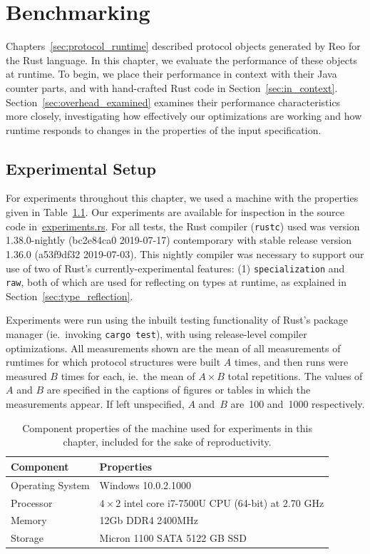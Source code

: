 \chapter{Benchmarking}
\label{sec:benchmarking}

Chapters~\ref{sec:protocol_runtime} described protocol objects generated by Reo for the Rust language. In this chapter, we evaluate the performance of these objects at runtime. To begin, we place their performance in context with their Java counter parts, and with hand-crafted Rust code in Section~\ref{sec:in_context}. Section~\ref{sec:overhead_examined} examines their performance characteristics more closely, investigating how effectively our optimizations are working and how runtime responds to changes in the properties of the input specification.

\section{Experimental Setup}
For experiments throughout this chapter, we used a machine with the properties given in Table~\ref{tab:nomad}. Our experiments are available for inspection in the source code in~\url{experiments.rs}. For all tests, the Rust compiler (\texttt{rustc}) used was version 1.38.0-nightly (bc2e84ca0 2019-07-17) contemporary with stable release version 1.36.0 (a53f9df32 2019-07-03). This nightly compiler was necessary to support our use of two of Rust's currently-experimental features: (1) \texttt{specialization} and \texttt{raw}, both of which are used for reflecting on types at runtime, as explained in Section~\ref{sec:type_reflection}.

Experiments were run using the inbuilt testing functionality of Rust's package manager (ie.\ invoking \texttt{cargo test}), with using release-level compiler optimizations. All measurements shown are the mean of all measurements of runtimes for which protocol structures were built $A$ times, and then runs were measured $B$ times for each, ie.\ the mean of $A\times{}B$ total repetitions. The values of $A$ and $B$ are specified in the captions of figures or tables in which the measurements appear. If left unspecified, $A$ and~$B$ are~100 and~1000 respectively.

\begin{table}[]
	\begin{tabular}{l|l}
	Component & Properties \\ \hline
	Operating System 	& Windows 10.0.2.1000 \\
	Processor	& $4\times{2}$ intel core i7-7500U CPU (64-bit) at 2.70 GHz \\
	Memory 	& 12Gb  DDR4 2400MHz \\
	Storage & Micron 1100 SATA 5122 GB SSD  \\
	
	\end{tabular}
\caption{Component properties of the machine used for experiments in this chapter, included for the sake of reproductivity.}
\label{tab:nomad}
\end{table}





